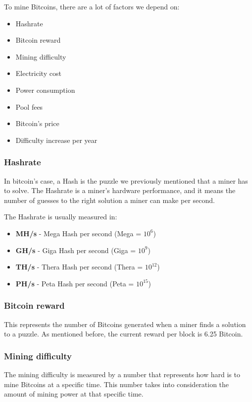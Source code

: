 \documentclass{article}
\newcommand\tab[1][1cm]{\hspace*{#1}}
\begin{document}
To mine Bitcoins, there are a lot of factors we depend on:
\begin{itemize}
 \item Hashrate
 \item Bitcoin reward
 \item Mining difficulty
 \item Electricity cost
 \item Power consumption
 \item Pool fees
 \item Bitcoin's price
 \item Difficulty increase per year
\end{itemize}

\newpage

\subsubsection{Hashrate}

\tab In bitcoin's case, a Hash is the puzzle we previously mentioned that a miner has to solve. The Hashrate is a miner's hardware performance, and it means the number of guesses to the right solution a miner can make per second.

The Hashrate is usually measured in:

\begin{itemize}
 \item \textbf{MH/s} - Mega Hash per second (Mega = \(10^6\))
 \item \textbf{GH/s} - Giga Hash per second (Giga = \(10^9\))
 \item \textbf{TH/s} - Thera Hash per second (Thera = \(10^{12}\))
 \item \textbf{PH/s} - Peta Hash per second (Peta = \(10^{15}\))
\end{itemize}

\subsubsection{Bitcoin reward}

\tab This represents the number of Bitcoins generated when a miner finds a solution to a puzzle. As mentioned before, the current reward per block is 6.25 Bitcoin.

\subsubsection{Mining difficulty}

\tab The mining difficulty is measured by a number that represents how hard is to mine Bitcoins at a specific time. This number takes into consideration the amount of mining power at that specific time.
\end{document}

